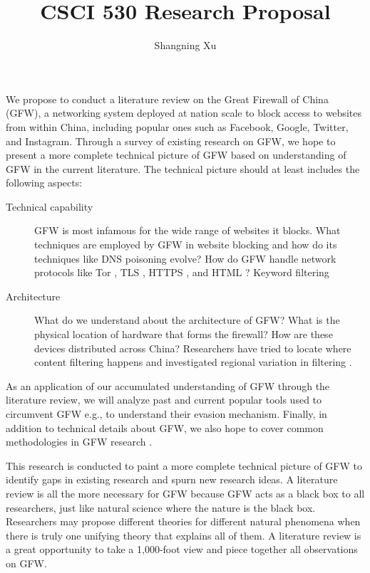 \documentclass{article}
\title{CSCI 530 Research Proposal}
\author{Shangning Xu}
\begin{document}
\maketitle

We propose to conduct a literature review on the Great Firewall of China (GFW), a networking system deployed at nation scale to block access to websites from within China, including popular ones such as Facebook, Google, Twitter, and Instagram. Through a survey of existing research on GFW, we hope to present a more complete technical picture of GFW based on understanding of GFW in the current literature. The technical picture should at least includes the following aspects:

\begin{description}
    \item[Technical capability] GFW is most infamous for the wide range of websites it blocks. What techniques are employed by GFW in website blocking and how do its techniques like DNS poisoning \cite{farnan2016poisoning,anonymous2014towards,nguyen2021how,anonymous2020triplet,lowe2007a} evolve? How do GFW handle network protocols like Tor \cite{winter2012how,dunna2018analyzing}, TLS \cite{frolov2019use}, HTTPS \cite{bock2021even}, and HTML \cite{park2010empirical}? Keyword filtering \cite{weinberg2021chinese}
    \item[Architecture] What do we understand about the architecture of GFW? What is the physical location of hardware that forms the firewall? How are these devices distributed across China? Researchers have tried to locate where content filtering happens \cite{xu2011internet} and investigated regional variation in filtering \cite{wright2014regional}.
\end{description}

As an application of our accumulated understanding of GFW through the literature review, we will analyze past and current popular tools used to circumvent GFW e.g., \cite{clayton2006ignoring} to understand their evasion mechanism. Finally, in addition to technical details about GFW, we also hope to cover common methodologies in GFW research \cite{scheitle2018long}.

This research is conducted to paint a more complete technical picture of GFW to identify gaps in existing research and spurn new research ideas. A literature review is all the more necessary for GFW because GFW acts as a black box to all researchers, just like natural science where the nature is the black box. Researchers may propose different theories for different natural phenomena when there is truly one unifying theory that explains all of them. A literature review is a great opportunity to take a 1,000-foot view and piece together all observations on GFW.
\end{document}
